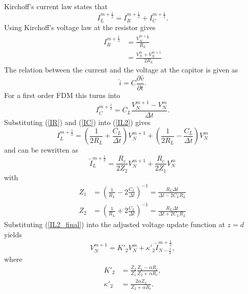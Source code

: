 Kirchoff's current law states that
\begin{equation}
    I^{m+\frac{1}{2}}_{L} = I^{m+\frac{1}{2}}_{R} + I^{m+\frac{1}{2}}_{C}.
    \label{IL2}
\end{equation}
Using Kirchoff's voltage law at the resistor gives
\begin{align}
    I^{m+\frac{1}{2}}_{R} & = \frac{V^{m+\frac{1}{2}}_{N}}{R_{L}}\\
    & = \frac{V^{m}_{N}+V^{m+1}_{N}}{2R_{L}}
    \label{IR}
\end{align}
The relation between the current and the voltage at the capitor is given as
\begin{equation}
    \hat{i} = C\frac{\partial \hat{v}}{\partial t}.
\end{equation}
For a first order FDM this turns into
\begin{equation}
    I^{m+\frac{1}{2}}_{C} = C_{L}\frac{V^{m+1}_{N} - V^{m}_{N}}{\Delta t}.
    \label{IC}
\end{equation}
Substituting (\ref{IR}) and (\ref{IC}) into (\ref{IL2}) gives
\begin{equation}
    I^{m+\frac{1}{2}}_{L} = \left(\frac{1}{2R_{L}}+\frac{C_{L}}{\Delta t}\right)V^{m+1}_N + \left(\frac{1}{2R_{L}}-\frac{C_{L}}{\Delta t}\right)V^{m}_N
\end{equation}
and can be rewritten as
\begin{equation}
    \tilde{I}^{m+\frac{1}{2}}_{L} = \frac{R_{c}}{2Z_{2}}V^{m+1}_N + \frac{R_{c}}{2Z_{1}}V^{m}_N
    \label{IL2_final}
\end{equation}
with
\begin{align}
    Z_{1} &= \left(\frac{1}{R_{L}}-2\frac{C_{L}}{\Delta t}\right)^{-1} = \frac{R_{L}\Delta t}{\Delta t - 2 C_{L}R_{L}} \nonumber\\
    Z_{2} &= \left(\frac{1}{R_{L}}+2\frac{C_{L}}{\Delta t}\right)^{-1} = \frac{R_{L}\Delta t}{\Delta t + 2 C_{L}R_{L}} \label{eq:Z}
\end{align}
Substituting (\ref{IL2_final}) into the adjusted voltage update function at $z=d$ yields
\begin{equation}
    V^{m+1}_{N} = K'_{2}V^{m}_N + \kappa'_{2}\tilde{I}^{m+\frac{1}{2}}_{N-\frac{1}{2}},
\end{equation}
where
\begin{align}
    K'_{2} & = \frac{Z_{2}}{Z_{1}}\frac{Z_{1}-\alpha R_{c}}{Z_{2}+\alpha R_{c}},\\
    \kappa'_{2} & = \frac{2\alpha Z_{2}}{Z_{2}+\alpha R_{c}}.
\end{align}


